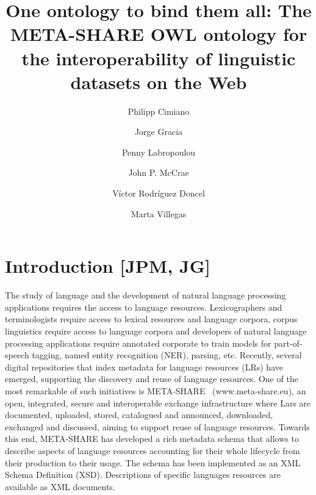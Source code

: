 \documentclass{llncs}
\begin{document}
\title{One ontology to bind them all: The META-SHARE OWL ontology for the interoperability of linguistic datasets on the Web}
%
%
\author{Philipp Cimiano \and Jorge Gracia \and Penny Labropoulou \and John P. McCrae \and V\'ictor Rodr\'iguez Doncel \and Marta Villegas}
%
%
%
\maketitle %
\begin{abstract}
\end{abstract}


\section{Introduction [JPM, JG]}
\label{sec:introduction}

The study of language and the development of natural language processing applications requires the access to language resources. Lexicographers and terminologists require access to lexical resources and language corpora, corpus linguistics require access to language corpora and developers of natural language processing applications require annotated corporate to train models for part-of-speech tagging, named entity recognition (NER), parsing, etc. 
Recently, several digital repositories that index metadata for language resources (LRs) have emerged, supporting the discovery and reuse of language resources. One of the most remarkable of such initiatives is META-SHARE~\cite{piperidis2012meta} (www.meta-share.eu), an open, integrated, secure and interoperable exchange infrastructure where Lars are documented, uploaded, stored, catalogued and announced, downloaded, exchanged and discussed, aiming to support reuse of language resources. Towards this end, META-SHARE has developed a rich metadata schema that allows to describe aspects of language resources accounting for their whole lifecycle from their production to their usage. The schema has been implemented as an XML Schema Definition (XSD). Descriptions of specific languages resources are available as XML documents.
\end{document}
